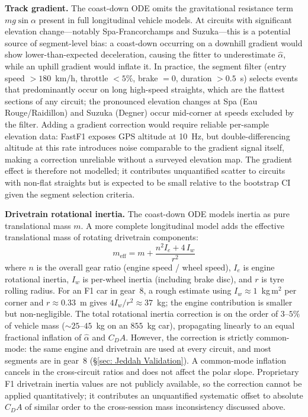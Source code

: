 \textbf{Track gradient.} The coast-down ODE omits the gravitational resistance term $mg\sin\alpha$ present in full longitudinal vehicle models. At circuits with significant elevation change---notably Spa-Francorchamps and Suzuka---this is a potential source of segment-level bias: a coast-down occurring on a downhill gradient would show lower-than-expected deceleration, causing the fitter to underestimate $\hat\alpha$, while an uphill gradient would inflate it. In practice, the segment filter (entry speed $>180$~km/h, throttle $<5\%$, brake $= 0$, duration $>0.5$~s) selects events that predominantly occur on long high-speed straights, which are the flattest sections of any circuit; the pronounced elevation changes at Spa (Eau Rouge/Raidillon) and Suzuka (Degner) occur mid-corner at speeds excluded by the filter. Adding a gradient correction would require reliable per-sample elevation data: FastF1 exposes GPS altitude at 10~Hz, but double-differencing altitude at this rate introduces noise comparable to the gradient signal itself, making a correction unreliable without a surveyed elevation map. The gradient effect is therefore not modelled; it contributes unquantified scatter to circuits with non-flat straights but is expected to be small relative to the bootstrap CI given the segment selection criteria.

\textbf{Drivetrain rotational inertia.} The coast-down ODE models inertia as pure translational mass $m$. A more complete longitudinal model adds the effective translational mass of rotating drivetrain components:
\begin{equation}
    m_\text{eff} = m + \frac{n^2 I_e + 4\,I_w}{r^2}
\end{equation}
where $n$ is the overall gear ratio (engine speed / wheel speed), $I_e$ is engine rotational inertia, $I_w$ is per-wheel inertia (including brake disc), and $r$ is tyre rolling radius. For an F1 car in gear~8, a rough estimate using $I_w \approx 1$~kg\,m$^2$ per corner and $r \approx 0.33$~m gives $4I_w/r^2 \approx 37$~kg; the engine contribution is smaller but non-negligible. The total rotational inertia correction is on the order of $3$--$5\%$ of vehicle mass ($\sim\!25$--$45$~kg on an $855$~kg car), propagating linearly to an equal fractional inflation of $\hat\alpha$ and $C_DA$. However, the correction is strictly common-mode: the same engine and drivetrain are used at every circuit, and most segments are in gear~8 (\S\ref{sec: Jeddah Validation}). A common-mode inflation cancels in the cross-circuit ratios and does not affect the polar slope. Proprietary F1 drivetrain inertia values are not publicly available, so the correction cannot be applied quantitatively; it contributes an unquantified systematic offset to absolute $C_DA$ of similar order to the cross-session mass inconsistency discussed above.

